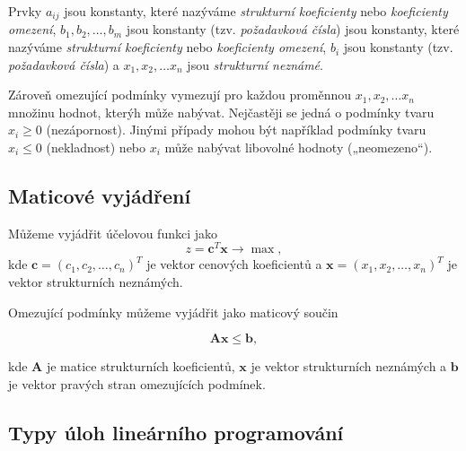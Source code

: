 Prvky $a_{ij}$ jsou konstanty, které nazýváme \textit{strukturní koeficienty} nebo \textit{koeficienty omezení},
$b_1, b_2, \ldots, b_m$
jsou konstanty (tzv. \textit{požadavková čísla})
jsou konstanty, které nazýváme \textit{strukturní koeficienty} nebo \textit{koeficienty omezení}, $b_i$ jsou konstanty (tzv. \textit{požadavková čísla})
a $x_1, x_2, \ldots x_n$ jsou \textit{strukturní neznámé}.

Zároveň omezující podmínky vymezují pro každou proměnnou $x_1, x_2, \ldots x_n$ množinu hodnot, kterýh může nabývat. 
Nejčastěji se jedná o podmínky tvaru $x_i \geq 0$ (nezápornost).
Jinými případy mohou být například podmínky tvaru $x_i \leq 0$ (nekladnost) nebo $x_i$ může nabývat libovolné hodnoty („neomezeno“).

\subsection{Maticové vyjádření}

Můžeme vyjádřit účelovou funkci jako $$ z = \bm{c}^T\bm{x} \rightarrow \max ,$$
kde $\bm{c} = (c_1, c_2, \ldots, c_n)^T$ je vektor cenových koeficientů a $\bm{x} = (x_1, x_2, \ldots, x_n)^T$ je vektor strukturních neznámých.

Omezující podmínky můžeme vyjádřit jako maticový součin

$$ \bm{A}\bm{x} \leq \bm{b} ,$$

kde $\bm{A}$ je matice strukturních koeficientů, $\bm{x}$ je vektor strukturních neznámých
a $\bm{b}$ je vektor pravých stran omezujících podmínek.

\subsection{Typy úloh lineárního programování}